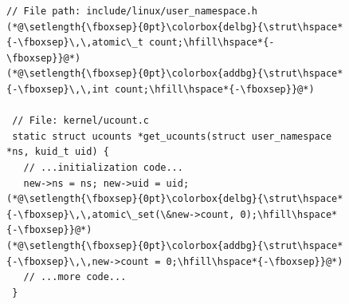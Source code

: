 \documentclass[sigconf]{acmart}
\begin{document}
\begin{figure}[ht]
\centering
\begin{lstlisting}[style=cstylediff,
  caption={CVE-2017-6874 in Linux kernel: The patch replaces an atomic reference counter with a lock-protected integer to prevent race conditions leading to a use-after-free vulnerability. By ensuring that \texttt{ucounts->count} is properly decremented and checked under \texttt{ucounts\_lock}, the fix eliminates unsafe concurrent access.},
  label={fig:code3}]
 // File path: include/linux/user_namespace.h
(*@\setlength{\fboxsep}{0pt}\colorbox{delbg}{\strut\hspace*{-\fboxsep}\,\,atomic\_t count;\hfill\hspace*{-\fboxsep}}@*)
(*@\setlength{\fboxsep}{0pt}\colorbox{addbg}{\strut\hspace*{-\fboxsep}\,\,int count;\hfill\hspace*{-\fboxsep}}@*)

 // File: kernel/ucount.c
 static struct ucounts *get_ucounts(struct user_namespace *ns, kuid_t uid) {
   // ...initialization code...
   new->ns = ns; new->uid = uid;
(*@\setlength{\fboxsep}{0pt}\colorbox{delbg}{\strut\hspace*{-\fboxsep}\,\,atomic\_set(\&new->count, 0);\hfill\hspace*{-\fboxsep}}@*)
(*@\setlength{\fboxsep}{0pt}\colorbox{addbg}{\strut\hspace*{-\fboxsep}\,\,new->count = 0;\hfill\hspace*{-\fboxsep}}@*)
   // ...more code...
 }


\end{lstlisting}
\end{figure}
\end{document}
